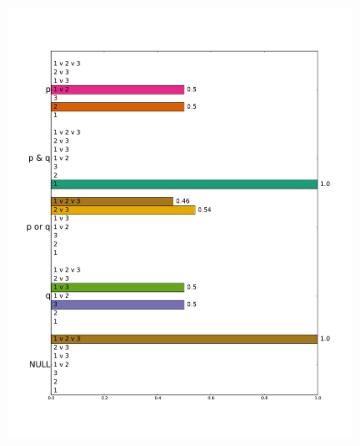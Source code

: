 \documentclass{article}
\begin{document}
\begin{figure}[tp]
  \begin{subfigure}{0.48\textwidth}
    \includegraphics[width=1\textwidth]{fig/scalardisj-expertise-listener-marginalized}
  \end{subfigure}
  \hfill
  \begin{subfigure}{0.48\textwidth}

\end{subfigure}
\end{figure}
\end{document}
